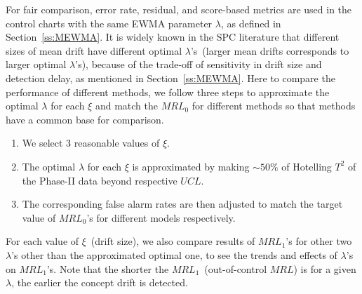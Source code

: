 \documentclass[twoside,11pt]{article}
\begin{document}
\begin{appendices}
For fair comparison, error rate, residual, and score-based metrics are used in the control charts with the same EWMA parameter $\lambda$, as defined in Section~\ref{ss:MEWMA}. It is widely known in the SPC literature that different sizes of mean drift have different optimal $ \lambda$'s~(larger mean drifts corresponds to larger optimal $ \lambda$'s), because of the trade-off of sensitivity in drift size and detection delay, as mentioned in Section~\ref{ss:MEWMA}. Here to compare the performance of different methods, we follow three steps to approximate the optimal $\lambda$ for each $\xi$ and match the $MRL_0$ for different methods so that methods have a common base for comparison.
\begin{enumerate}[1.]
    \item We select $3$ reasonable values of $\xi$.
    \item The optimal $\lambda$ for each $\xi$ is approximated by making $\sim 50\%$ of Hotelling $T^2$ of the Phase-II data beyond respective $UCL$.
    \item The corresponding false alarm rates are then adjusted to match the target value of $MRL_0$'s for different models respectively.
\end{enumerate}
For each value of $\xi$~(drift size), we also compare results of $MRL_1$'s for other two $\lambda$'s other than the approximated optimal one, to see the trends and effects of $\lambda$'s on $MRL_1$'s. Note that the shorter the $MRL_1$~(out-of-control $MRL$) is for a given $ \lambda$, the earlier the concept drift is detected.


\end{appendices}
\end{document}
